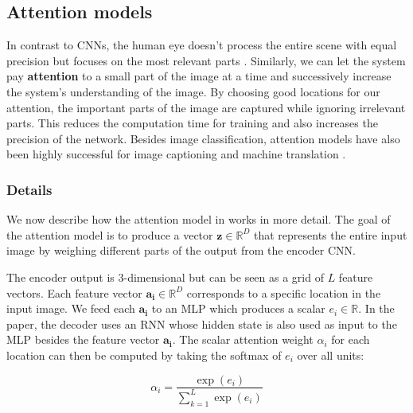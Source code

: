 \subsection{Attention models}
\label{ssec:attention}


In contrast to CNNs, the human eye doesn't process the entire scene with equal precision but focuses on the most relevant parts \cite{DeepMindAttention}.
Similarly, we can let the system pay \textbf{attention} to a small part of the image at a time and successively increase the system's understanding of the image.
By choosing good locations for our attention, the important parts of the image are captured while ignoring irrelevant parts.
This reduces the computation time for training and also increases the precision of the network.
Besides image classification, attention models have also been highly successful for image captioning \cite{AttendAndTell} and machine translation \cite{machine_translation_attention}.

\subsubsection{Details}
We now describe how the attention model in \cite{AttendAndTell} works in more detail.
The goal of the attention model is to produce a vector $\mathbf{z} \in \mathbb{R}^D$ that represents the entire input image by weighing different parts of the output from the encoder CNN.

The encoder output is 3-dimensional but can be seen as a grid of $L$ feature vectors. Each feature vector $\mathbf{a_i} \in \mathbb{R}^D$ corresponds to a specific location in the input image. We feed each $\mathbf{a_i}$ to an MLP which produces a scalar $e_i \in \mathbb{R}$. In the paper, the decoder uses an RNN whose hidden state is also used as input to the MLP besides the feature vector $\mathbf{a_i}$.
The scalar attention weight $\alpha_i$ for each location can then be computed by taking the softmax of $e_i$ over all units:

\[
\alpha_i = \frac{ \exp(e_i) }{ \sum_{k=1}^L \exp(e_i) }
\]

